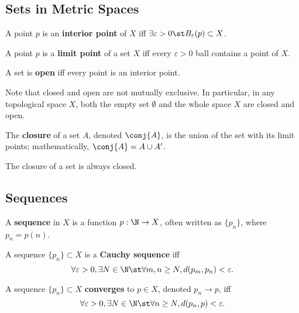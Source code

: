 \documentclass{notes}
\renewcommand{\emph}[1]{\textbf{#1}}
\begin{document}
\subsection{Sets in Metric Spaces}
\begin{defn}
  A point $p$ is an \emph{interior point} of $X$ iff $\exists \varepsilon > 0 \st B_\varepsilon(p)
\subset X$.
\end{defn}
\begin{defn}
  A point $p$ is a \emph{limit point} of a set $X$ iff every $\varepsilon > 0$ ball contains a 
point of $X$.
\end{defn}
\begin{defn}
  A set is \emph{open} iff every point is an interior point.
\end{defn}
Note that closed and open are not mutually exclusive. In particular, in any topological space $X$, both
the empty set $\emptyset$ and the whole space $X$ are closed and open.
\begin{defn}
  The \emph{closure} of a set $A$, denoted $\conj{A}$, is the union of the set with its limit points;
mathematically, $\conj{A} = A \cup A'$.
\end{defn}
\begin{proposition}
  The closure of a set is always closed.
\end{proposition}

\subsection{Sequences}
\begin{defn}
  A \emph{sequence} in $X$ is a function $p: \N \to X$, often written as $\{p_n\}$, where $p_n = p(n)$. 
\end{defn}

\begin{defn}
  A sequence $\{p_n\} \subset X$ is a \emph{Cauchy sequence} iff $$\forall \varepsilon > 0, \exists 
N\in\N \st \forall m,n \geq N, d(p_m, p_n) < \varepsilon.$$
\end{defn}

\begin{defn}
  A sequence $\{p_n\} \subset X$ \emph{converges} to $p\in X$, denoted $p_n \to p$, iff 
$$\forall \varepsilon > 0, \exists N\in\N \st \forall n \geq N, d(p_n, p) < \varepsilon.$$
\end{defn}
\end{document}
